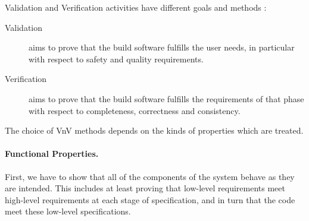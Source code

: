 \documentclass{template/openetcs_article}
\begin{document}
 


Validation and Verification activities have different goals and methods :
\begin{description}
\item [Validation] aims to prove that the build software fulfills the user needs, in particular with respect to safety and quality requirements.
\item [Verification] aims to prove that the build software fulfills the requirements of that
phase with respect to completeness, correctness and consistency.
\end{description}



The choice of VnV methods depends on the kinds of properties which are treated.




\paragraph{Functional Properties.}

First, we have to show that all of the components of the system behave
as they are intended. This includes at least proving that low-level requirements meet
high-level requirements at each stage of specification, and in turn that the code meet these low-level
specifications. 
\end{document}
